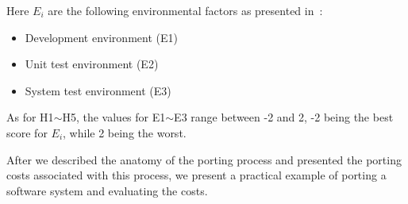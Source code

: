 Here $E_i$ are the following environmental factors as presented in~\cite{hakuta}:
\begin{itemize}
    \item Development environment (E1)
    \item Unit test environment (E2)
    \item System test environment (E3)
\end{itemize}

As for H1$\sim$H5, the values for E1$\sim$E3 range between -2 and 2, -2 being the best
score for $E_i$, while 2 being the worst.

After we described the anatomy of the porting process and presented the porting
costs associated with this process, we present a practical example of porting a
software system and evaluating the costs.
